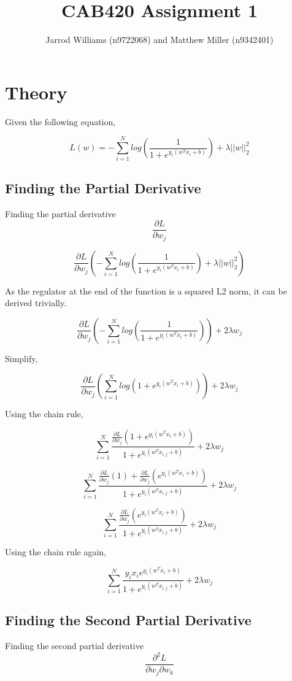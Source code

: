 \documentclass[]{report}   %
\begin{document}
\title{CAB420 Assignment 1}   %
\author{Jarrod Williams (n9722068) and Matthew Miller (n9342401)}         %
\maketitle

\chapter{Theory}

Given the following equation,

$$L(w)=-\sum_{i=1}^{N}log(\frac{1}{1+e^{y_i(w^Tx_i+b)}})+\lambda||w||_2^2$$

\section{Finding the Partial Derivative}
Finding the partial derivative $$\frac{\partial L}{\partial w_j}$$

$$\frac{\partial L}{\partial w_j}(-\sum_{i=1}^{N}log(\frac{1}{1+e^{y_i(w^Tx_i+b)}})+\lambda||w||_2^2)$$

As the regulator at the end of the function is a squared L2 norm, it can be derived trivially.

$$\frac{\partial L}{\partial w_j}(-\sum_{i=1}^{N}log(\frac{1}{1+e^{y_i(w^Tx_i+b)}}))+2\lambda w_j$$

Simplify,

$$\frac{\partial L}{\partial w_j}(\sum_{i=1}^{N}log(1+e^{y_i(w^Tx_i+b)}))+2\lambda w_j$$

Using the chain rule,

$$\sum_{i=1}^{N}\frac{\frac{\partial L}{\partial w_j}(1+e^{y_i(w^Tx_i+b)})}{1+e^{y_i(w^Tx_{i,j}+b)}}+2\lambda w_j$$

$$\sum_{i=1}^{N}\frac{\frac{\partial L}{\partial w_j}(1)+\frac{\partial L}{\partial w_j}(e^{y_i(w^Tx_i+b)})}{1+e^{y_i(w^Tx_{i,j}+b)}}+2\lambda w_j$$

$$\sum_{i=1}^{N}\frac{\frac{\partial L}{\partial w_j}(e^{y_i(w^Tx_i+b)})}{1+e^{y_i(w^Tx_{i,j}+b)}}+2\lambda w_j$$

Using the chain rule again,

$$\sum_{i=1}^{N}\frac{y_ix_ie^{y_i(w^Tx_i+b)}}{1+e^{y_i(w^Tx_{i,j}+b)}}+2\lambda w_j$$

\section{Finding the Second Partial Derivative}
Finding the second partial derivative $$\frac{\partial^2 L}{\partial w_j\partial w_k}$$
\end{document}
